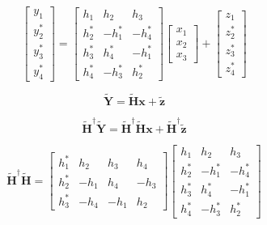 \documentclass[fleqn]{article}
\begin{document}
\begin{enumerate}
\begin{enumerate}
			\begin{equation*}
				\begin{bmatrix}
					y_1 \\ y_2^* \\ y_3^* \\ y_4^*
				\end{bmatrix} = \begin{bmatrix}
					h_1   &  h_2   &  h_3 \\
				    h_2^* & -h_1^* & -h_4^* \\
					h_3^* &  h_4^* & -h_1^* \\
					h_4^* & -h_3^* &  h_2^*
				\end{bmatrix} \begin{bmatrix}
					x_1 \\ x_2 \\ x_3
				\end{bmatrix} + \begin{bmatrix}
					z_1 \\ z_2^* \\ z_3^* \\ z_4^*
				\end{bmatrix}
			\end{equation*}
			
			\begin{equation*}
				\mathbf{\tilde{Y}} = \mathbf{\tilde{H}x} + \mathbf{\tilde{z}}
			\end{equation*}
			
			\begin{equation*}
				\mathbf{\tilde{H}^\dagger\tilde{Y}} = \mathbf{\tilde{H}^\dagger\tilde{H}x} + \mathbf{\tilde{H}^\dagger\tilde{z}}
			\end{equation*}
			
			\begin{equation*}
				\mathbf{\tilde{H}^\dagger\tilde{H}} = \begin{bmatrix}
					h_1^* &  h_2 &  h_3 &  h_4 \\
					h_2^* & -h_1 &  h_4 & -h_3 \\
					h_3^* & -h_4 & -h_1 &  h_2
				\end{bmatrix} \begin{bmatrix}
					h_1   &  h_2   &  h_3 \\
				    h_2^* & -h_1^* & -h_4^* \\
					h_3^* &  h_4^* & -h_1^* \\
					h_4^* & -h_3^* &  h_2^*
				\end{bmatrix}
			\end{equation*}
			

\end{enumerate}
\end{enumerate}
\end{document}
